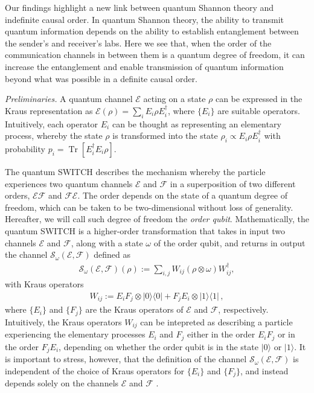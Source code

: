 \documentclass[aps,prl,twocolumn,superscriptaddress,groupedaddress]{revtex4}
\def\EQ#1{\begin{equation}\begin{aligned}#1\end{aligned}\end{equation}}
\def\>{\rangle}
\newcommand{\Tr}{\operatorname{Tr}}
\newcommand{\ketbra}[2]{|#1\rangle\langle #2|}
\newcommand{\map}[1]{\mathcal{#1}}
\begin{document}
  Our findings highlight a new link between quantum Shannon theory and indefinite causal order. In quantum Shannon theory, the ability to transmit quantum information depends on the ability to establish entanglement between the sender's and receiver's labs. Here we see that, when the  order  of the communication channels in between them is a quantum degree of freedom, it can increase the entanglement and enable transmission of quantum information beyond what was possible in a definite causal order.  

% 
{\em Preliminaries.} A quantum channel $\map E$ acting on a state $\rho$ can be expressed in the Kraus  representation as $\map E(\rho)=\sum_i E_i \rho E_i^\dagger$, where $\{E_i\}$ are suitable operators.  Intuitively, each operator $E_i$ can be thought as representing an elementary process, whereby the state $\rho$ is transformed into the state $\rho_i  \propto   E_i \rho E_i^\dag$ with probability $p_i  = \Tr [  E_i^\dag E_i  \rho]$.  
 
  The quantum SWITCH \cite{Chiribella2013} describes the mechanism whereby the particle  experiences two quantum channels $\map E$ and $\map F$  in a superposition of two different orders, $\map E \map F$ and $\map F \map E$. The order depends on the state of a quantum degree of freedom, which can be taken to be two-dimensional without loss of generality.  Hereafter, we will call such degree of freedom  the {\em order qubit}.   
 Mathematically, the quantum SWITCH is a higher-order transformation \cite{chiribella2008transforming,chiribella2009theoretical}  that takes in input  two channels $\map E$ and
$\map F$, along with a state $\omega$ of the order qubit, and returns in output   the channel  $\map S_{\omega} (\map E, \map F)$ defined as
\EQ{
\map S_{\omega} (\map E, \map F)\left(\rho\right):= \sum_{i,j} W_{ij} \left(\rho \otimes \omega \right) W_{ij}^\dagger,  \label{SWITCH}
}
with Kraus operators
\EQ{
W_{ij}:=E_i F_j \otimes \ketbra{0}{0} + F_j  E_i \otimes \ketbra{1}{1} \,,  \label{SwitchKraus}
}
where $\{E_i\}$ and $\{F_j\}$ are the Kraus operators of $\map E$ and $\map F$, respectively.    Intuitively,  the Kraus operators $W_{ij}$ can be intepreted as describing a particle experiencing the elementary processes $E_i$ and $F_j$ either in the order $E_i F_j$ or in the order $F_j  E_i$, depending on whether the order qubit is in the state $|0\>$ or $|1\>$.   It is important to stress, however,  that the definition of the channel $\map S_{\omega} (\map E, \map F)$ is independent of the choice of Kraus operators for $\{E_i\}$ and $\{F_j\}$, and instead depends solely on the channels  $\map E$ and $\map F$ \cite{Chiribella2013}. 
  
\end{document}
